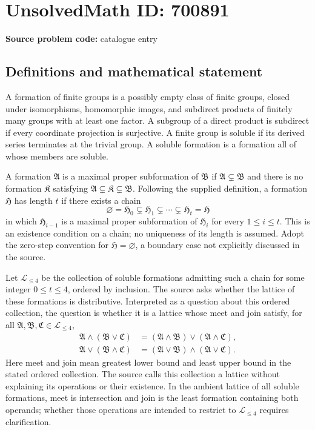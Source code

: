 \documentclass[11pt]{article}
\begin{document}
\section*{UnsolvedMath ID: 700891}
\textbf{Source problem code:} catalogue entry
\subsection{Definitions and mathematical statement}
A formation of finite groups is a possibly empty class of finite groups, closed under isomorphisms, homomorphic images, and subdirect products of finitely many groups with at least one factor. A subgroup of a direct product is subdirect if every coordinate projection is surjective. A finite group is soluble if its derived series terminates at the trivial group. A soluble formation is a formation all of whose members are soluble.

A formation \(\mathfrak A\) is a maximal proper subformation of \(\mathfrak B\) if \(\mathfrak A\subsetneq\mathfrak B\) and there is no formation \(\mathfrak K\) satisfying \(\mathfrak A\subsetneq\mathfrak K\subsetneq\mathfrak B\). Following the supplied definition, a formation \(\mathfrak H\) has length \(t\) if there exists a chain
\[
\varnothing=\mathfrak H_0\subsetneq\mathfrak H_1\subsetneq\cdots\subsetneq\mathfrak H_t=\mathfrak H
\]
in which \(\mathfrak H_{i-1}\) is a maximal proper subformation of \(\mathfrak H_i\) for every \(1\leq i\leq t\). This is an existence condition on a chain; no uniqueness of its length is assumed. Adopt the zero-step convention for \(\mathfrak H=\varnothing\), a boundary case not explicitly discussed in the source.

Let \(\mathcal L_{\leq4}\) be the collection of soluble formations admitting such a chain for some integer \(0\leq t\leq4\), ordered by inclusion. The source asks whether the lattice of these formations is distributive. Interpreted as a question about this ordered collection, the question is whether it is a lattice whose meet and join satisfy, for all \(\mathfrak A,\mathfrak B,\mathfrak C\in\mathcal L_{\leq4}\),
\[
\begin{aligned}
\mathfrak A\wedge(\mathfrak B\vee\mathfrak C)
&=(\mathfrak A\wedge\mathfrak B)\vee(\mathfrak A\wedge\mathfrak C),\\
\mathfrak A\vee(\mathfrak B\wedge\mathfrak C)
&=(\mathfrak A\vee\mathfrak B)\wedge(\mathfrak A\vee\mathfrak C).
\end{aligned}
\]
Here meet and join mean greatest lower bound and least upper bound in the stated ordered collection. The source calls this collection a lattice without explaining its operations or their existence. In the ambient lattice of all soluble formations, meet is intersection and join is the least formation containing both operands; whether those operations are intended to restrict to \(\mathcal L_{\leq4}\) requires clarification.
\end{document}
